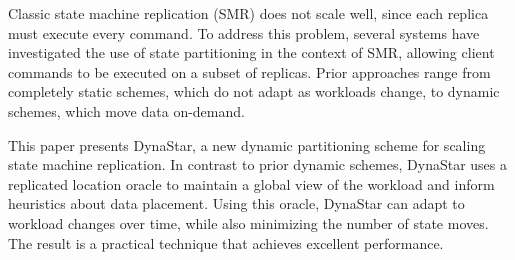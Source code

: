 Classic state machine replication (SMR) does not scale well, since
each replica must execute every command.  To address this problem,
several systems have investigated the use of state partitioning in the
context of SMR, allowing client commands to be executed on a subset of
replicas. Prior approaches range from completely static schemes, which do not
adapt as workloads change, to dynamic schemes, which move data on-demand.


This paper presents DynaStar, a new dynamic partitioning scheme for
scaling state machine replication. In contrast to prior dynamic
schemes, DynaStar uses a replicated location oracle to maintain a global view
of the workload and inform heuristics about data placement. Using this
oracle, DynaStar can adapt to workload changes over time,
while also minimizing the number of state moves. The result is a
practical technique that achieves excellent performance.


